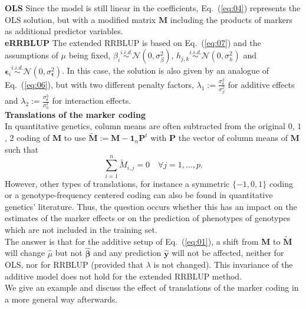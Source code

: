 \documentclass{bmcart}
\newcommand{\M}{\mathbf{M}}
\newcommand{\0}{\mathbf{0}}
\renewcommand{\P}{\mathbf{P}}
\begin{document}
{\bf OLS} Since the model is still linear in the coefficients, Eq.~(\ref{eq:04}) represents the OLS solution, but with a modified matrix $\M$ including the products of markers as additional predictor variables. \vspace{0.4cm}\\
{\bf eRRBLUP}
The extended RRBLUP is based on Eq.~(\ref{eq:07}) and the assumptions of $\mu$ being fixed, ${\beta_i}\stackrel{i.i.d.}{\sim} \mathcal{N}(0,\sigma_\beta^2)$, $h_{j,k }\stackrel{i.i.d.}{\sim} \mathcal{N}(0,\sigma_h^2)$ and ${{\bm{\epsilon}}_i}\stackrel{i.i.d.}{\sim} \mathcal{N}(0,\sigma_{\bm{\epsilon}}^2)$. In this case, the solution is also given by an analogue of Eq.~(\ref{eq:06}), but with two different penalty factors, $\lambda_1:=\frac{\sigma_{\bm{\epsilon}}^2}{\sigma_\beta^2}$ for additive effects and $\lambda_2:=\frac{\sigma_{\bm{\epsilon}}^2}{\sigma_h^2}$ for interaction effects.
\vspace{0.4cm}\\
{\bf Translations of the marker coding}\vspace{0.2cm}\\
In quantitative genetics, column means are often subtracted from the original $0$, $1$, $2$ coding of $\M$ to 
use $\tilde{\M}:=\M-\mathbf{1}_n\P^t$ with $\P$ the vector of column means of $\M$ such that 
$$\sum_{i=1}^n \tilde{M}_{i,j} = 0\quad \forall j =1,\dots,p.$$ 
However, other types of translations, for instance a symmetric $\{-1,0,1\}$ coding or a genotype-frequency centered coding \cite{alvarez2007unified} can also be found in quantitative genetics' literature. Thus, the question occurs whether this has an impact on the estimates of the marker effects or on the prediction of phenotypes of genotypes which are not included in the training set. \\

The answer is that for the additive setup of Eq.~(\ref{eq:01}), a shift from $\M$ to $\tilde{\M}$ will change $\hat{\mu}$ but not $\hat{\bm{\beta}}$ and any prediction $\hat{\mathbf{y}}$ will not be affected, neither for OLS, nor for RRBLUP (provided that $\lambda$ is not changed). This invariance of the additive model does not hold for the extended RRBLUP method. \\

We give an example and discuss the effect of translations of the marker coding in a more general way afterwards. \\
\end{document}
